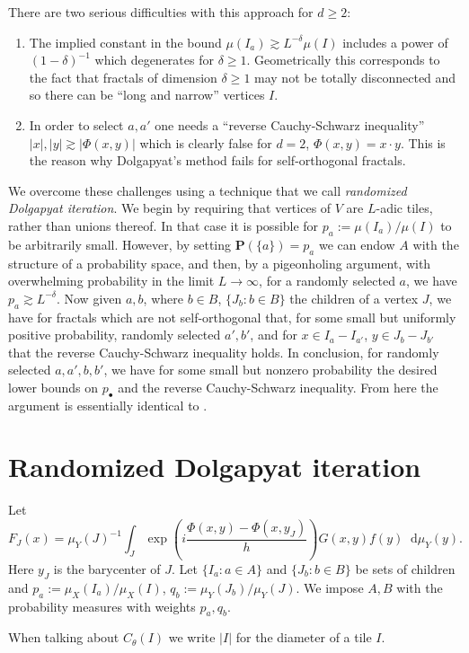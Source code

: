 \documentclass[reqno,10pt]{amsart}
\newcommand{\PP}{\mathbf P}
\newcommand*\dif{\mathop{}\!\mathrm{d}}
\newcommand{\dfn}[1]{\emph{#1}\index{#1}}
\theoremstyle{definition}
\numberwithin{equation}{section}
\begin{document}
There are two serious difficulties with this approach for $d \geq 2$:
\begin{enumerate}
\item The implied constant in the bound $\mu(I_a) \gtrsim L^{-\delta} \mu(I)$ includes a power of $(1 - \delta)^{-1}$ which degenerates for $\delta \geq 1$. Geometrically this corresponds to the fact that fractals of dimension $\delta \geq 1$ may not be totally disconnected and so there can be ``long and narrow'' vertices $I$.
\item In order to select $a, a'$ one needs a ``reverse Cauchy-Schwarz inequality'' $|x|, |y| \gtrsim |\Phi(x, y)|$ which is clearly false for $d = 2$, $\Phi(x, y) = x \cdot y$. This is the reason why Dolgapyat's method fails for self-orthogonal fractals.
\end{enumerate}
We overcome these challenges using a technique that we call \dfn{randomized Dolgapyat iteration}.
We begin by requiring that vertices of $V$ are $L$-adic tiles, rather than unions thereof.
In that case it is possible for $p_a := \mu(I_a)/\mu(I)$ to be arbitrarily small.
However, by setting $\PP(\{a\}) = p_a$ we can endow $A$ with the structure of a probability space, and then, by a pigeonholing argument, with overwhelming probability in the limit $L \to \infty$, for a randomly selected $a$, we have $p_a \gtrsim L^{-\delta}$.
Now given $a, b$, where $b \in B$, $\{J_b: b \in B\}$ the children of a vertex $J$, we have for fractals which are not self-orthogonal that, for some small but uniformly positive probability, randomly selected $a', b'$, and for $x \in I_a - I_{a'}$, $y \in J_b - J_{b'}$ that the reverse Cauchy-Schwarz inequality holds.
In conclusion, for randomly selected $a, a', b, b'$, we have for some small but nonzero probability the desired lower bounds on $p_\bullet$ and the reverse Cauchy-Schwarz inequality.
From here the argument is essentially identical to \cite{Dyatlov_2018}.

\section{Randomized Dolgapyat iteration}
Let
$$F_J(x) = \mu_Y(J)^{-1} \int_J \exp\left(i\frac{\Phi(x, y) - \Phi(x, y_J)}{h}\right) G(x, y) f(y) \dif \mu_Y(y).$$
Here $y_J$ is the barycenter of $J$.
Let $\{I_a: a \in A\}$ and $\{J_b: b \in B\}$ be sets of children and $p_a := \mu_X(I_a)/\mu_X(I)$, $q_b := \mu_Y(J_b)/\mu_Y(J)$.
We impose $A, B$ with the probability measures with weights $p_a, q_b$.

When talking about $C_\theta(I)$ we write $|I|$ for the diameter of a tile $I$.
\end{document}
